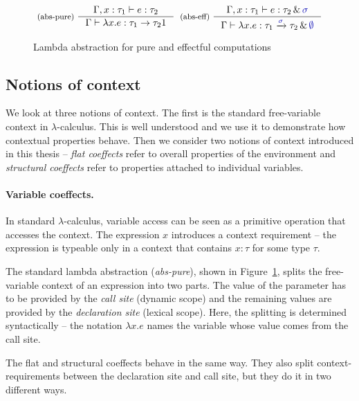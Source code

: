 
\begin{figure}
\[
\tyrule{abs-pure}
  { \Gamma, x\-:\-\tau_1 \vdash e : \tau_2}
  { \Gamma \vdash \lambda x.e : \tau_1 \rightarrow \tau_2 1}
\;\;
\tyrule{abs-eff}
  { \Gamma, x\-:\-\tau_1 \vdash e : \tau_2 \,\&\, \aclrd{\sigma} }
  { \Gamma \vdash \lambda x.e : \tau_1 \xrightarrow{\aclrd{\sigma}} \tau_2 \,\&\, \aclrd{\emptyset} }
\]
\caption{Lambda abstraction for pure and effectful computations}
\label{fig:applications-abs}
\end{figure}


\subsection{Notions of context}

We look at three notions of context. The first is the standard free-variable context in 
$\lambda$-calculus. This is well understood and we use it to demonstrate how contextual 
properties behave. Then we consider two notions of context introduced in this thesis --
\emph{flat coeffects} refer to overall properties of the environment and \emph{structural coeffects} 
refer to properties attached to individual variables. 

\paragraph{Variable coeffects.}

In standard $\lambda$-calculus, variable access can be seen as a primitive operation that 
accesses the context. The expression $x$ introduces a context requirement -- the expression 
is typeable only in a context that contains $x:\tau$ for some type $\tau$. 

The standard lambda abstraction (\emph{abs-pure}), shown in Figure~\ref{fig:applications-abs},
splits the free-variable context of an expression into two parts. The value of the parameter
has to be provided by the \emph{call site} (dynamic scope) and the remaining values are provided 
by the \emph{declaration site} (lexical scope). Here, the splitting is determined syntactically --
the notation $\lambda x.e$ names the variable whose value comes from the call site.

The flat and structural coeffects behave in the same way. They also split context-requirements
between the declaration site and call site, but they do it in two different ways.

